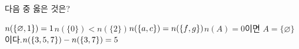 다음 중 옳은 것은?
\begin{choicesii}{$n(\{\varnothing{,}\mkern3mu\mathopen{}1\})=1$}{$n(\{0\})<n(\{2\})$}{$n(\{a{,}\mkern3mu\mathopen{}c\})=n(\{f{,}\mkern3mu\mathopen{}g\})$}{$n(A)=0$이면 $A=\{\varnothing\}$이다.}{$n(\{3{,}\mkern3mu\mathopen{}5{,}\mkern3mu\mathopen{}7\})-n(\{3{,}\mkern3mu\mathopen{}7\})=5$}\end{choicesii}
